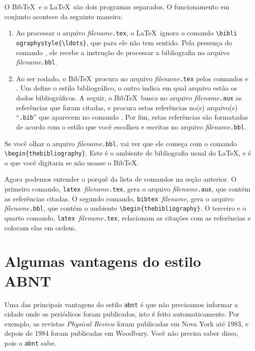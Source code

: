 \documentclass[a4paper,12pt]{article}
\newcommand{\ca}{\c{c}\~ao}
\newcommand{\co}{\c{c}\~oes}
\begin{document}
O Bib\TeX\ e o \LaTeX\ s\~ao dois programas separados.
O funcionamento em conjunto acontece da seguinte maneira:
\begin{enumerate}
\item 
Ao processar o arquivo {\it filename}\verb+.tex+,
o \LaTeX\ ignora o comando \verb+\bibli+ \verb+ographystyle{\ldots}+,
que para ele n\~ao tem sentido. Pela presen\c{c}a do comando
\verb++, ele recebe a instru{\ca} de processar a
bibliografia no arquivo {\it filename}\verb+.bbl+. 
\item
Ao ser rodado, o Bib\TeX\, procura no arquivo
{\it filename}\verb+.tex+ pelos comandos \verb++
e \verb++. Um define o estilo bibliogr\'afico, o outro
indica em qual arquivo est\~ao os dados bibliogr\'aficos.
A seguir, o Bib\TeX\ busca no arquivo
{\it filename}\verb+.aux+ as refer\^encias que foram citadas,
e procura estas refer\^encias no(s) arquivo(s) ``\verb+.bib+'' que
aparecem no comando \verb++.
Por fim, estas refer\^encias s\~ao formatadas de acordo com o estilo que
voc\^e escolheu e escritas no arquivo {\it filename}\verb+.bbl+.
\end{enumerate}

Se voc\^e olhar o arquivo {\it filename}\verb+.bbl+, 
vai ver que ele come\c{c}a com o comando \verb+\begin{thebibliography}+.
Este \'e o ambiente de bibliografia usual do \LaTeX , e \'e
o que voc\^e digitaria se n\~ao usasse o Bib\TeX .

Agora podemos entender o porqu\^e da lista de comandos na se{\ca}
anterior. O primeiro comando, \verb+latex +{\it filename}\verb+.tex+,
gera o arquivo {\it filename}\verb+.aux+, que cont\'em as refer\^encias
citadas. O segundo comando, \verb+bibtex +{\it filename},
gera o arquivo {\it filename}\verb+.bbl+, que cont\'em o ambiente
\verb+\begin{thebibliography}+. O terceiro e o quarto comando,
\verb+latex +{\it filename}\verb+.tex+, relacionam as cita{\co}
com as refer\^encias e colocam elas em ordem.




\section{Algumas vantagens do estilo ABNT}
\label{sec_abnt}


Uma das principais vantagens do estilo \verb+abnt+ \'e que n\~ao
precisamos informar a cidade onde os peri\'odicos foram publicados,
isto \'e feito automaticamente. Por exemplo, as revistas 
{\em Physical Review} foram publicadas em Nova York at\'e 1983, e depois de
1984 foram publicadas em Woodbury. Voc\^e n\~ao precisa
saber disso, pois o \verb+abnt+ sabe.
\end{document}
